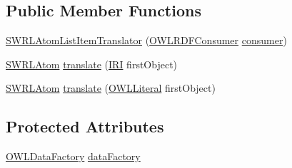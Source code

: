 \subsection*{Public Member Functions}
\begin{DoxyCompactItemize}
\item 
\hyperlink{classorg_1_1coode_1_1owlapi_1_1rdfxml_1_1parser_1_1_s_w_r_l_atom_list_item_translator_ad9c966ee9d217ce8919b4819c5b7085e}{S\-W\-R\-L\-Atom\-List\-Item\-Translator} (\hyperlink{classorg_1_1coode_1_1owlapi_1_1rdfxml_1_1parser_1_1_o_w_l_r_d_f_consumer}{O\-W\-L\-R\-D\-F\-Consumer} \hyperlink{classorg_1_1coode_1_1owlapi_1_1rdfxml_1_1parser_1_1_s_w_r_l_atom_list_item_translator_af658748afc4b33bc79f38da077207f5c}{consumer})
\item 
\hyperlink{interfaceorg_1_1semanticweb_1_1owlapi_1_1model_1_1_s_w_r_l_atom}{S\-W\-R\-L\-Atom} \hyperlink{classorg_1_1coode_1_1owlapi_1_1rdfxml_1_1parser_1_1_s_w_r_l_atom_list_item_translator_a225d8459ba04ee64c63892d85d0283f7}{translate} (\hyperlink{classorg_1_1semanticweb_1_1owlapi_1_1model_1_1_i_r_i}{I\-R\-I} first\-Object)
\item 
\hyperlink{interfaceorg_1_1semanticweb_1_1owlapi_1_1model_1_1_s_w_r_l_atom}{S\-W\-R\-L\-Atom} \hyperlink{classorg_1_1coode_1_1owlapi_1_1rdfxml_1_1parser_1_1_s_w_r_l_atom_list_item_translator_a8cfb47bafb0305f6d9be30d7812dd640}{translate} (\hyperlink{interfaceorg_1_1semanticweb_1_1owlapi_1_1model_1_1_o_w_l_literal}{O\-W\-L\-Literal} first\-Object)
\end{DoxyCompactItemize}
\subsection*{Protected Attributes}
\begin{DoxyCompactItemize}
\item 
\hyperlink{interfaceorg_1_1semanticweb_1_1owlapi_1_1model_1_1_o_w_l_data_factory}{O\-W\-L\-Data\-Factory} \hyperlink{classorg_1_1coode_1_1owlapi_1_1rdfxml_1_1parser_1_1_s_w_r_l_atom_list_item_translator_a0da86e375ff53ceaebea21e16937e7e4}{data\-Factory}
\end{DoxyCompactItemize}
